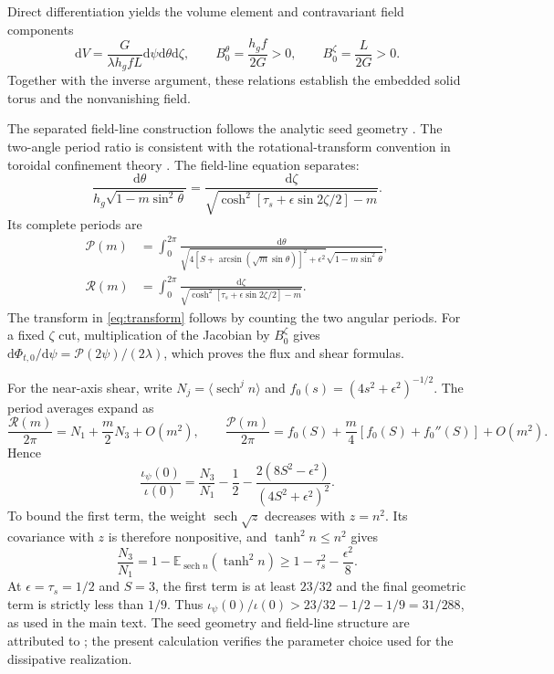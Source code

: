 \documentclass[11pt,a4paper]{article}
\theoremstyle{remark}\newtheorem{remark}{Remark}
\numberwithin{equation}{section}
\newcommand{\dd}{\mathrm{d}}
\newcommand{\sech}{\operatorname{sech}}
\begin{document}
Direct differentiation yields the volume element and contravariant field components
\begin{equation}
\dd V=\frac{G}{\lambda h_gfL}\dd\psi\dd\theta\dd\zeta,
\qquad B_0^\theta=\frac{h_gf}{2G}>0,
\qquad B_0^\zeta=\frac{L}{2G}>0.
\label{eq:jacobian}
\end{equation}
Together with the inverse argument, these relations establish the embedded solid torus and the nonvanishing field.

The separated field-line construction follows the analytic seed geometry \citep{Landreman,Issan}. The two-angle period ratio is consistent with the rotational-transform convention in toroidal confinement theory \citep{Kruskal1958,Helander2014}. The field-line equation separates:
\begin{equation}
\frac{\dd\theta}{h_g\sqrt{1-m\sin^2\theta}}
=\frac{\dd\zeta}{\sqrt{\cosh^2[\tau_s+\epsilon\sin2\zeta/2]-m}}.
\label{eq:fieldlineseparation}
\end{equation}
Its complete periods are
\begin{equation}
\begin{aligned}
\mathcal P(m)&=\int_0^{2\pi}
\frac{\dd\theta}
{\sqrt{4[S+\arcsin(\sqrt m\sin\theta)]^2+\epsilon^2}
\sqrt{1-m\sin^2\theta}},\\
\mathcal R(m)&=\int_0^{2\pi}
\frac{\dd\zeta}{\sqrt{\cosh^2[\tau_s+\epsilon\sin2\zeta/2]-m}}.
\end{aligned}
\label{eq:periods}
\end{equation}
The transform in \eqref{eq:transform} follows by counting the two angular periods. For a fixed $\zeta$ cut, multiplication of the Jacobian by $B_0^\zeta$ gives $\dd\Phi_{t,0}/\dd\psi=\mathcal P(2\psi)/(2\lambda)$, which proves the flux and shear formulas.

For the near-axis shear, write $N_j=\langle\sech^j n\rangle$ and $f_0(s)=(4s^2+\epsilon^2)^{-1/2}$. The period averages expand as
\[
\frac{\mathcal R(m)}{2\pi}=N_1+\frac m2N_3+O(m^2),\qquad
\frac{\mathcal P(m)}{2\pi}=f_0(S)+\frac m4[f_0(S)+f_0''(S)]+O(m^2).
\]
Hence
\begin{equation}
\frac{\iota_\psi(0)}{\iota(0)}
=\frac{N_3}{N_1}-\frac12-
\frac{2(8S^2-\epsilon^2)}{(4S^2+\epsilon^2)^2}.
\label{eq:axialshear}
\end{equation}
To bound the first term, the weight $\sech\sqrt z$ decreases with $z=n^2$. Its covariance with $z$ is therefore nonpositive, and $\tanh^2n\le n^2$ gives
\[
\frac{N_3}{N_1}=1-\mathbb E_{\sech n}(\tanh^2n)
\ge1-\tau_s^2-\frac{\epsilon^2}{8}.
\]
At $\epsilon=\tau_s=1/2$ and $S=3$, the first term is at least $23/32$ and the final geometric term is strictly less than $1/9$. Thus $\iota_\psi(0)/\iota(0)>23/32-1/2-1/9=31/288$, as used in the main text. The seed geometry and field-line structure are attributed to \citet{Landreman,Issan}; the present calculation verifies the parameter choice used for the dissipative realization.
\end{document}
